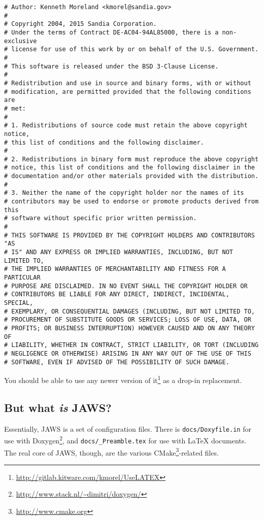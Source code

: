 \begin{lstlisting}[basicstyle=\ttfamily\scriptsize]
# Author: Kenneth Moreland <kmorel@sandia.gov>
#
# Copyright 2004, 2015 Sandia Corporation.
# Under the terms of Contract DE-AC04-94AL85000, there is a non-exclusive
# license for use of this work by or on behalf of the U.S. Government.
#
# This software is released under the BSD 3-Clause License.
#
# Redistribution and use in source and binary forms, with or without
# modification, are permitted provided that the following conditions are
# met:
#
# 1. Redistributions of source code must retain the above copyright notice,
# this list of conditions and the following disclaimer.
#
# 2. Redistributions in binary form must reproduce the above copyright
# notice, this list of conditions and the following disclaimer in the
# documentation and/or other materials provided with the distribution.
#
# 3. Neither the name of the copyright holder nor the names of its
# contributors may be used to endorse or promote products derived from this
# software without specific prior written permission.
#
# THIS SOFTWARE IS PROVIDED BY THE COPYRIGHT HOLDERS AND CONTRIBUTORS "AS
# IS" AND ANY EXPRESS OR IMPLIED WARRANTIES, INCLUDING, BUT NOT LIMITED TO,
# THE IMPLIED WARRANTIES OF MERCHANTABILITY AND FITNESS FOR A PARTICULAR
# PURPOSE ARE DISCLAIMED. IN NO EVENT SHALL THE COPYRIGHT HOLDER OR
# CONTRIBUTORS BE LIABLE FOR ANY DIRECT, INDIRECT, INCIDENTAL, SPECIAL,
# EXEMPLARY, OR CONSEQUENTIAL DAMAGES (INCLUDING, BUT NOT LIMITED TO,
# PROCUREMENT OF SUBSTITUTE GOODS OR SERVICES; LOSS OF USE, DATA, OR
# PROFITS; OR BUSINESS INTERRUPTION) HOWEVER CAUSED AND ON ANY THEORY OF
# LIABILITY, WHETHER IN CONTRACT, STRICT LIABILITY, OR TORT (INCLUDING
# NEGLIGENCE OR OTHERWISE) ARISING IN ANY WAY OUT OF THE USE OF THIS
# SOFTWARE, EVEN IF ADVISED OF THE POSSIBILITY OF SUCH DAMAGE.
\end{lstlisting}

You should be able to use any newer version of it\footnote{\url{http://gitlab.kitware.com/kmorel/UseLATEX}} as a drop-in replacement.

\subsection{But what \emph{is} JAWS?}

Essentially, JAWS is a set of configuration files. There is \lstinline{docs/Doxyfile.in} for use with Doxygen\footnote{\url{http://www.stack.nl/~dimitri/doxygen/}}, and \lstinline{docs/_Preamble.tex} for use with \LaTeX{} documents. The real core of JAWS, though, are the various CMake\footnote{\url{http://www.cmake.org}}-related files.

